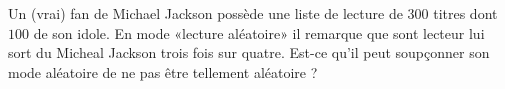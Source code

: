 
\begin{exercice}\label{exosmath-0681}

    Un (vrai) fan de Michael Jackson possède une liste de lecture de \( 300\) titres dont \( 100\) de son idole. En mode «lecture aléatoire» il remarque que sont lecteur lui sort du Micheal Jackson trois fois sur quatre. Est-ce qu'il peut soupçonner son mode aléatoire de ne pas être tellement aléatoire ?

\end{exercice}
